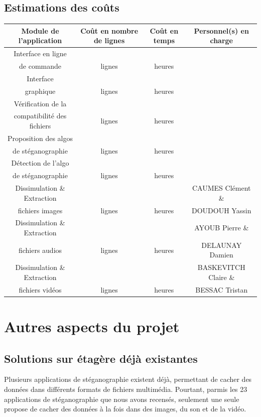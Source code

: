 \documentclass[11pt]{article}
\begin{document}
\subsection{Estimations des coûts}
\small
\begin{tabular}{|c|c|c|c|}
  \hline
  \textbf{Module de l'application} & \textbf{Coût en nombre de lignes} & \textbf{Coût en temps} & \textbf{Personnel(s) en charge} \\
  \hline
    Interface en ligne &  &  &  \\ 
    de commande & lignes & heures & \\
  \hline
  Interface &  &  &  \\
  graphique & lignes & heures & \\
  \hline
  Vérification de la &  &  &  \\
   compatibilité des fichiers & lignes & heures & \\
  \hline
    Proposition des algos &  &  &  \\
   de stéganographie & lignes & heures & \\
  \hline
    Détection de l'algo &  &  &  \\
   de stéganographie & lignes & heures & \\
  \hline
  Dissimulation \& Extraction &  &  & CAUMES Clément \& \\
   fichiers images & lignes & heures & DOUDOUH Yassin \\
  \hline
  Dissimulation \& Extraction &  &  & AYOUB Pierre \& \\
   fichiers audios & lignes & heures & DELAUNAY Damien \\
     \hline
  Dissimulation \& Extraction &  &  & BASKEVITCH Claire \& \\
   fichiers vidéos & lignes & heures & BESSAC Tristan \\
  \hline
\end{tabular}
\small

\section{Autres aspects du projet}

\subsection{Solutions sur étagère déjà existantes}

Plusieurs applications de stéganographie existent déjà, permettant de cacher des
données dans différents formats de fichiers multimédia. Pourtant, parmis les 23
applications de stéganographie que nous avons recensés, seulement une seule
propose de cacher des données à la fois dans des images, du son et de la vidéo.
\end{document}
